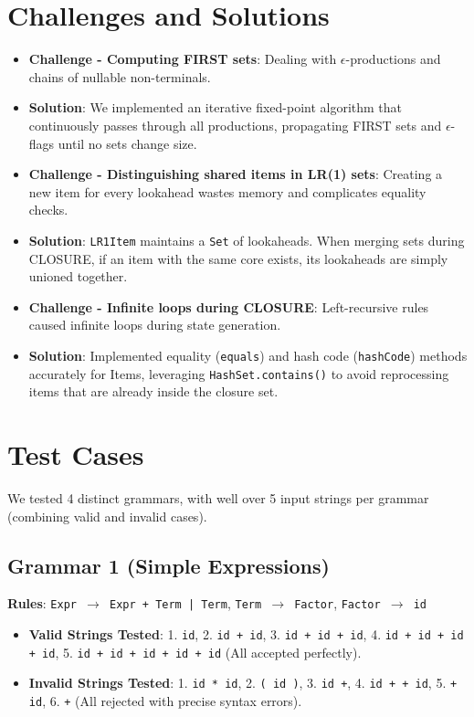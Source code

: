 \documentclass[11pt,a4paper]{article}
\begin{document}
\section{Challenges and Solutions}
\begin{itemize}
    \item \textbf{Challenge - Computing FIRST sets}: Dealing with $\epsilon$-productions and chains of nullable non-terminals.
    \item \textbf{Solution}: We implemented an iterative fixed-point algorithm that continuously passes through all productions, propagating FIRST sets and $\epsilon$-flags until no sets change size.
    \item \textbf{Challenge - Distinguishing shared items in LR(1) sets}: Creating a new item for every lookahead wastes memory and complicates equality checks.
    \item \textbf{Solution}: \texttt{LR1Item} maintains a \texttt{Set} of lookaheads. When merging sets during CLOSURE, if an item with the same core exists, its lookaheads are simply unioned together.
    \item \textbf{Challenge - Infinite loops during CLOSURE}: Left-recursive rules caused infinite loops during state generation.
    \item \textbf{Solution}: Implemented equality (\texttt{equals}) and hash code (\texttt{hashCode}) methods accurately for Items, leveraging \texttt{HashSet.contains()} to avoid reprocessing items that are already inside the closure set.
\end{itemize}

\section{Test Cases}
We tested 4 distinct grammars, with well over 5 input strings per grammar (combining valid and invalid cases).

\subsection{Grammar 1 (Simple Expressions)}
\textbf{Rules}: \texttt{Expr $\rightarrow$ Expr + Term | Term}, \texttt{Term $\rightarrow$ Factor}, \texttt{Factor $\rightarrow$ id}
\begin{itemize}
    \item \textbf{Valid Strings Tested}: 1. \texttt{id}, 2. \texttt{id + id}, 3. \texttt{id + id + id}, 4. \texttt{id + id + id + id}, 5. \texttt{id + id + id + id + id} (All accepted perfectly).
    \item \textbf{Invalid Strings Tested}: 1. \texttt{id * id}, 2. \texttt{( id )}, 3. \texttt{id +}, 4. \texttt{id + + id}, 5. \texttt{+ id}, 6. \texttt{+} (All rejected with precise syntax errors).
\end{itemize}
\end{document}

